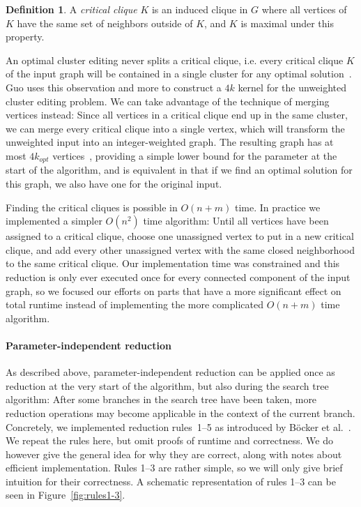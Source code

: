 \documentclass[12pt,oneside,english,parskip=full,headings=small]{scrbook}
\theoremstyle{definition}
\newtheorem{definition}[theorem]{Definition}
\begin{document}
\begin{definition}
	A \emph{critical clique} $K$ is an induced clique in $G$ where all vertices of $K$ have the same
	set of neighbors outside of $K$, and $K$ is maximal under this property. 
\end{definition}

An optimal cluster editing never splits a critical clique, i.e. every critical clique $K$ of the
input graph will be contained in a single cluster for any optimal solution~\cite{Guo}. Guo uses this
observation and more to construct a $4k$ kernel for the unweighted cluster editing problem. We can
take advantage of the technique of merging vertices instead: Since all vertices in a critical clique
end up in the same cluster, we can merge every critical clique into a single vertex, which will
transform the unweighted input into an integer-weighted graph. The resulting graph has at most
$4k_{opt}$ vertices~\cite{GoingWeighted, Guo}, providing a simple lower bound for the parameter at
the start of the algorithm, and is equivalent in that if we find an optimal solution for this graph,
we also have one for the original input.

Finding the critical cliques is possible in $O(n + m)$ time. In practice we implemented a simpler
$O(n^2)$ time algorithm: Until all vertices have been assigned to a critical clique, choose one
unassigned vertex to put in a new critical clique, and add every other unassigned vertex with the
same closed neighborhood to the same critical clique. Our implementation time was constrained and
this reduction is only ever executed once for every connected component of the input graph, so we
focused our efforts on parts that have a more significant effect on total runtime instead of
implementing the more complicated $O(n + m)$ time algorithm.

\paragraph{Parameter-independent reduction} As described above, parameter-independent reduction can
be applied once as reduction at the very start of the algorithm, but also during the search tree
algorithm: After some branches in the search tree have been taken, more reduction operations may
become applicable in the context of the current branch. Concretely, we implemented reduction
rules~1--5 as introduced by Böcker et al.~\cite{ExactAlgos}. We repeat the rules here, but omit
proofs of runtime and correctness. We do however give the general idea for why they are correct,
along with notes about efficient implementation. Rules 1--3 are rather simple, so we will only give
brief intuition for their correctness. A schematic representation of rules 1--3 can be seen in
Figure~\ref{fig:rules1-3}.
\end{document}

